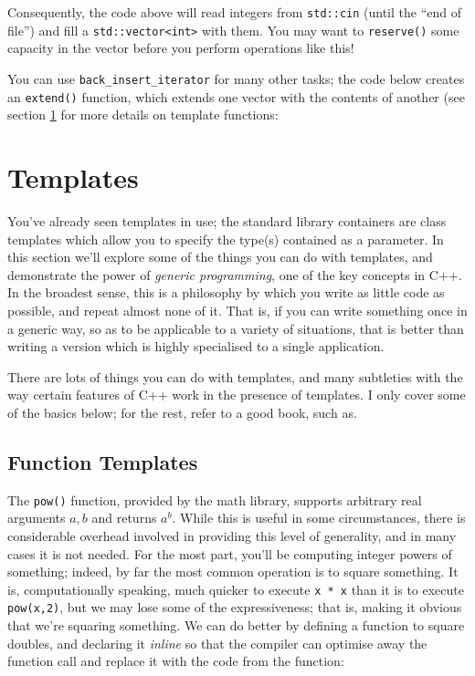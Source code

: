 \documentclass[a4paper]{scrartcl}
\begin{document}
Consequently, the code above will read integers from \verb|std::cin| (until the ``end of file'') and fill a \verb|std::vector<int>| with them. You may want to \verb|reserve()| some capacity in the vector before you perform operations like this!

You can use \verb|back_insert_iterator| for many other tasks; the code below creates an \verb|extend()| function, which extends one vector with the contents of another (see section \ref{sec:templates} for more details on template functions:



\section{Templates}\label{sec:templates}
You've already seen templates in use; the standard library containers are class templates which allow you to specify the type(s) contained as a parameter. In this section we'll explore some of the things you can do with templates, and demonstrate the power of \emph{generic programming}, one of the key concepts in C++. In the broadest sense, this is a philosophy by which you write as little code as possible, and repeat almost none of it. That is, if you can write something once in a generic way, so as to be applicable to a variety of situations, that is better than writing a version which is highly specialised to a single application.

There are lots of things you can do with templates, and many subtleties with the way certain features of C++ work in the presence of templates. I only cover some of the basics below; for the rest, refer to a good book, such as\cite{Templates}.

\subsection{Function Templates}\label{sec:templates_functions}
The \verb|pow()| function, provided by the math library, supports arbitrary real arguments $a,b$ and returns $a^b$. While this is useful in some circumstances, there is considerable overhead involved in providing this level of generality, and in many cases it is not needed. For the most part, you'll be computing integer powers of something; indeed, by far the most common operation is to square something. It is, computationally speaking, much quicker to execute \verb|x * x| than it is to execute \verb|pow(x,2)|, but we may lose some of the expressiveness; that is, making it obvious that we're squaring something. We can do better by defining a function to square doubles, and declaring it \emph{inline} so that the compiler can optimise away the function call and replace it with the code from the function:
\end{document}
